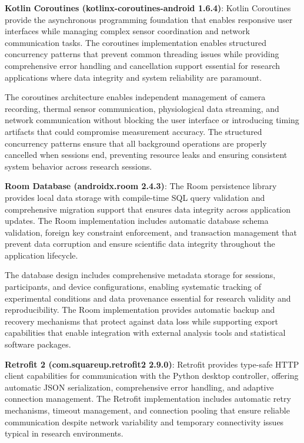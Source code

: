 \documentclass[12pt,a4paper]{report}
\begin{document}
\textbf{Kotlin Coroutines (kotlinx-coroutines-android 1.6.4)}: Kotlin Coroutines provide the asynchronous programming
foundation that enables responsive user interfaces while managing complex sensor coordination and network communication
tasks. The coroutines implementation enables structured concurrency patterns that prevent common threading issues while
providing comprehensive error handling and cancellation support essential for research applications where data integrity
and system reliability are paramount.

The coroutines architecture enables independent management of camera recording, thermal sensor communication,
physiological data streaming, and network communication without blocking the user interface or introducing timing
artifacts that could compromise measurement accuracy. The structured concurrency patterns ensure that all background
operations are properly cancelled when sessions end, preventing resource leaks and ensuring consistent system behavior
across research sessions.

\textbf{Room Database (androidx.room 2.4.3)}: The Room persistence library provides local data storage with compile-time SQL
query validation and comprehensive migration support that ensures data integrity across application updates. The Room
implementation includes automatic database schema validation, foreign key constraint enforcement, and transaction
management that prevent data corruption and ensure scientific data integrity throughout the application lifecycle.

The database design includes comprehensive metadata storage for sessions, participants, and device configurations,
enabling systematic tracking of experimental conditions and data provenance essential for research validity and
reproducibility. The Room implementation provides automatic backup and recovery mechanisms that protect against data
loss while supporting export capabilities that enable integration with external analysis tools and statistical software
packages.

\textbf{Retrofit 2 (com.squareup.retrofit2 2.9.0)}: Retrofit provides type-safe HTTP client capabilities for communication
with the Python desktop controller, offering automatic JSON serialization, comprehensive error handling, and adaptive
connection management. The Retrofit implementation includes automatic retry mechanisms, timeout management, and
connection pooling that ensure reliable communication despite network variability and temporary connectivity issues
typical in research environments.
\end{document}
